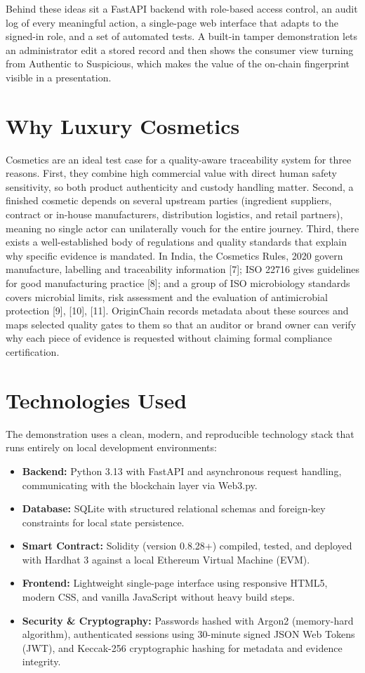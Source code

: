 \documentclass[12pt,a4paper]{report}
\begin{document}
Behind these ideas sit a FastAPI backend with role-based access control, an audit log of every meaningful action, a single-page web interface that adapts to the signed-in role, and a set of automated tests. A built-in tamper demonstration lets an administrator edit a stored record and then shows the consumer view turning from Authentic to Suspicious, which makes the value of the on-chain fingerprint visible in a presentation.

\section{Why Luxury Cosmetics}
Cosmetics are an ideal test case for a quality-aware traceability system for three reasons. First, they combine high commercial value with direct human safety sensitivity, so both product authenticity and custody handling matter. Second, a finished cosmetic depends on several upstream parties (ingredient suppliers, contract or in-house manufacturers, distribution logistics, and retail partners), meaning no single actor can unilaterally vouch for the entire journey. Third, there exists a well-established body of regulations and quality standards that explain why specific evidence is mandated. In India, the Cosmetics Rules, 2020 govern manufacture, labelling and traceability information [7]; ISO 22716 gives guidelines for good manufacturing practice [8]; and a group of ISO microbiology standards covers microbial limits, risk assessment and the evaluation of antimicrobial protection [9], [10], [11]. OriginChain records metadata about these sources and maps selected quality gates to them so that an auditor or brand owner can verify why each piece of evidence is requested without claiming formal compliance certification.

\section{Technologies Used}
The demonstration uses a clean, modern, and reproducible technology stack that runs entirely on local development environments:
\begin{itemize}[leftmargin=1.8em, itemsep=3pt, parsep=0pt]
    \item \textbf{Backend:} Python 3.13 with FastAPI and asynchronous request handling, communicating with the blockchain layer via Web3.py.
    \item \textbf{Database:} SQLite with structured relational schemas and foreign-key constraints for local state persistence.
    \item \textbf{Smart Contract:} Solidity (version 0.8.28+) compiled, tested, and deployed with Hardhat 3 against a local Ethereum Virtual Machine (EVM).
    \item \textbf{Frontend:} Lightweight single-page interface using responsive HTML5, modern CSS, and vanilla JavaScript without heavy build steps.
    \item \textbf{Security \& Cryptography:} Passwords hashed with Argon2 (memory-hard algorithm), authenticated sessions using 30-minute signed JSON Web Tokens (JWT), and Keccak-256 cryptographic hashing for metadata and evidence integrity.
\end{itemize}
\end{document}
